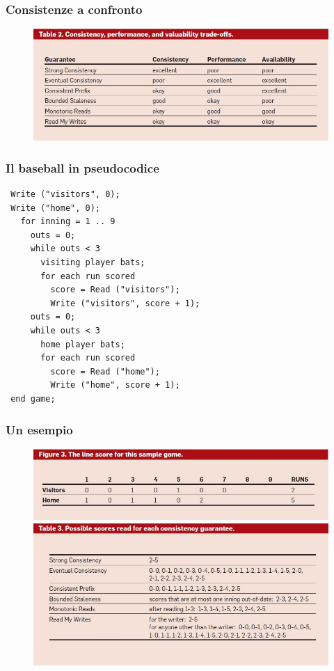 \begin{frame}
\frametitle{Consistenze a confronto}
	\begin{figure}
		\includegraphics[scale=0.5]{baseball/tab2.jpg}
	\end{figure}
\end{frame}

\begin{frame}[fragile]
\frametitle{Il baseball in pseudocodice}
\begin{lstlisting}
 Write ("visitors", 0);
 Write ("home", 0);
   for inning = 1 .. 9
     outs = 0;
     while outs < 3
       visiting player bats;
       for each run scored
         score = Read ("visitors");
         Write ("visitors", score + 1);
     outs = 0;
     while outs < 3
       home player bats;
       for each run scored
         score = Read ("home");
         Write ("home", score + 1);
 end game;
\end{lstlisting}
\end{frame}

\begin{frame}
\frametitle{Un esempio}
	\begin{figure}
		\includegraphics[scale=0.4]{baseball/tab3a.jpg}\\
		\includegraphics[scale=0.4]{baseball/tab3.jpg}
	\end{figure}
\end{frame}


